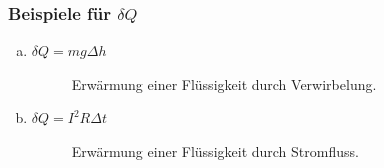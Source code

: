 \subsubsection{Beispiele für $\delta Q$}
\begin{enumerate}[a)]
    \item $\delta Q = m g \Delta h$
    
    \begin{figure}[H]
        \centering
        \def\svgwidth{0.4\textwidth}
        
        \caption{Erwärmung einer Flüssigkeit durch Verwirbelung.}
        \label{img:exampleDQpot}
    \end{figure}
    
    \item  $\delta Q = I^2 R \Delta t$
 
    \begin{figure}[H]
        \centering
        \def\svgwidth{0.28\textwidth}
        
        \caption{Erwärmung einer Flüssigkeit durch Stromfluss.}
        \label{img:exampleDQcoil}
    \end{figure}
    
\end{enumerate}
